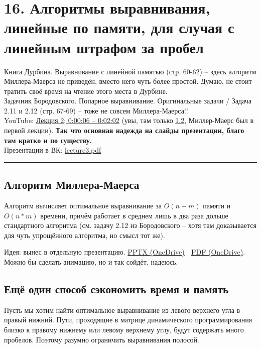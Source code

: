 \documentclass[a4paper,12pt]{article} %
\begin{document}
\section{16. Алгоритмы выравнивания, линейные по памяти, для случая с линейным штрафом за пробел}
Книга Дурбина.  Выравнивание с линейной памятью (стр. 60-62) -- здесь алгоритм Миллера-Маерса не приведён, вместо него чуть более простой. Думаю, не стоит тратить своё время на чтение этого места в Дурбине.\\
Задачник Бородовского.  Попарное выравнивание. Оригинальные задачи / Задача 2.11 и 2.12 (стр. 67-69) -- тоже не совсем Миллера-Маерса!!\\
YouTube: \href{https://youtu.be/gGoYQBBEX8M?t=6}{Лекция 2; 0:00:06 -- 0:02:02} (увы, там только \ref{section:economy_another}, Миллер-Маерс был в первой лекции). \textbf{Так что основная надежда на слайды презентации, благо там кратко и по существу.} \\
Презентации в ВК: \href{https://vk.com/doc155237002_519204981?hash=9c4f1a66b95c4fd7fa}{lecture3.pdf}

\hrule

\subsection{Алгоритм Миллера-Маерса}
Алгоритм вычисляет оптимальное выравнивание за $O(n+m)$ памяти и $O(n*m)$ времени, причём работает в среднем лишь в два раза дольше стандартного алгоритма (см. задачу 2.12 из Бородовского -- хотя там доказывается для чуть упрощённого алгоритма, но смысл тот же).

Идея: вынес в отдельную презентацию. \href{https://csspbstu-my.sharepoint.com/:p:/g/personal/zuev_va_edu_spbstu_ru/EauKoirdykhFlvBuplp5FEgBJBq66QcdmxADVppJ6LDy_g?e=hdDtps}{PPTX (OneDrive)} |  \href{https://csspbstu-my.sharepoint.com/:b:/g/personal/zuev_va_edu_spbstu_ru/EQQON2KiCRlIieAAtAn4FrQBtga-H5GNPHYAN8vxSSwW9A?e=EplqUx}{PDF (OneDrive)}. Можно бы сделать анимацию, но и так сойдёт, надеюсь.

\subsection{Ещё один способ сэкономить время и память}\label{section:economy_another}
Пусть мы хотим найти оптимальное выравнивание из левого верхнего угла в правый нижний. Пути, проходящие в матрице динамического программирования близко к правому нижнему или левому верхнему углу, будут содержать много пробелов. Поэтому разумно ограничить выравнивания полосой.
\end{document}
